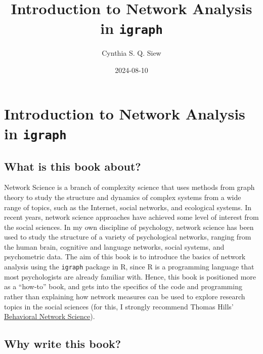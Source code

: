 \documentclass[
]{book}
\title{Introduction to Network Analysis in \texttt{igraph}}
\author{Cynthia S. Q. Siew}
\date{2024-08-10}
\begin{document}
\maketitle

{
\setcounter{tocdepth}{1}
\tableofcontents
}
\setcounter{section}{-1}

\chapter*{\texorpdfstring{Introduction to Network Analysis in \texttt{igraph}}{Introduction to Network Analysis in igraph}}\label{introduction-to-network-analysis-in-igraph}

\section{What is this book about?}\label{what-is-this-book-about}

Network Science is a branch of complexity science that uses methods from graph theory to study the structure and dynamics of complex systems from a wide range of topics, such as the Internet, social networks, and ecological systems. In recent years, network science approaches have achieved some level of interest from the social sciences. In my own discipline of psychology, network science has been used to study the structure of a variety of psychological networks, ranging from the human brain, cognitive and language networks, social systems, and psychometric data. The aim of this book is to introduce the basics of network analysis using the \texttt{igraph} package in R, since R is a programming language that most psychologists are already familiar with. Hence, this book is positioned more as a ``how-to'' book, and gets into the specifics of the code and programming rather than explaining how network measures can be used to explore research topics in the social sciences (for this, I strongly recommend Thomas Hills' \href{https://www.amazon.co.uk/Behavioral-Network-Science-Language-Society/dp/1108793339/}{Behavioral Network Science}).

\section{Why write this book?}\label{why-write-this-book}
\end{document}
